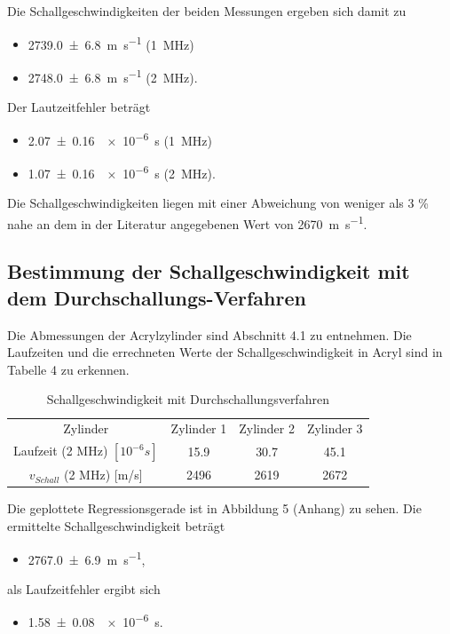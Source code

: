 \documentclass[11pt,ngerman,a4paper]{article}
\begin{document}
Die Schallgeschwindigkeiten der beiden Messungen ergeben sich damit zu 
\begin{itemize}
\item  \SI[per-mode=symbol]{2739.0\pm6.8}{\metre\per\second} (\SI{1}{\mega\hertz})
\item \SI[per-mode=symbol]{2748.0\pm6.8}{\metre\per\second} (\SI{2}{\mega\hertz}).
\end{itemize}
\noindent
Der Lautzeitfehler beträgt
\begin{itemize}
\item \SI[per-mode=symbol]{2.07\pm0.16}{\num{e-6}\second} (\SI{1}{\mega\hertz})
\item \SI[per-mode=symbol]{1.07\pm0.16}{\num{e-6}\second} (\SI{2}{\mega\hertz}).
\end{itemize}
\noindent
Die Schallgeschwindigkeiten liegen mit einer Abweichung von weniger als 3 \%  nahe an dem in der Literatur angegebenen Wert von \SI[per-mode=symbol]{2670}{\metre\per\second}.
\subsection{Bestimmung der Schallgeschwindigkeit mit dem Durchschallungs-Verfahren}

Die Abmessungen der Acrylzylinder sind Abschnitt 4.1 zu entnehmen. Die Laufzeiten und die errechneten Werte der Schallgeschwindigkeit in Acryl sind in Tabelle 4 zu erkennen.
\begin{table}[h]
\centering
 \begin{tabular}{|c||c|c|c|}
 Zylinder & Zylinder 1 & Zylinder 2 & Zylinder 3 \\
Laufzeit (2 MHz) $[10^{-6}s]$ & 15.9 & 30.7 & 45.1 \\
 $v_{Schall}$ (2 MHz) [m/s] & 2496 & 2619 & 2672 \\
 \end{tabular}
\caption{Schallgeschwindigkeit mit Durchschallungsverfahren}
\end{table}
Die geplottete Regressionsgerade ist in Abbildung 5 (Anhang) zu sehen. 
\newline
Die ermittelte Schallgeschwindigkeit beträgt
\begin{itemize}
\item \SI[per-mode=symbol]{2767.0\pm6.9}{\metre\per\second},
\end{itemize}
als Laufzeitfehler ergibt sich
\begin{itemize}
\item  \SI[per-mode=symbol]{1.58\pm0.08}{\num{e-6}\second}.
\end{itemize}
\end{document}

